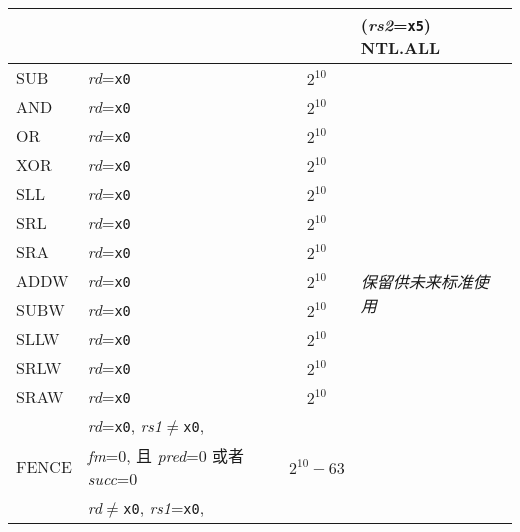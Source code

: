 \begin{table}[hbt]
\begin{tabular}{|l|l|c|l|}
                        &                                             &                             & ({\em rs2}={\tt x5}) NTL.ALL \\ \hline
  SUB                   & {\em rd}={\tt x0}                           & $2^{10}$                    & \multirow{22}{*}{\em 保留供未来标准使用} \\ \cline{1-3}
  AND                   & {\em rd}={\tt x0}                           & $2^{10}$                    & \\ \cline{1-3}
  OR                    & {\em rd}={\tt x0}                           & $2^{10}$                    & \\ \cline{1-3}
  XOR                   & {\em rd}={\tt x0}                           & $2^{10}$                    & \\ \cline{1-3}
  SLL                   & {\em rd}={\tt x0}                           & $2^{10}$                    & \\ \cline{1-3}
  SRL                   & {\em rd}={\tt x0}                           & $2^{10}$                    & \\ \cline{1-3}
  SRA                   & {\em rd}={\tt x0}                           & $2^{10}$                    & \\ \cline{1-3}
  ADDW                  & {\em rd}={\tt x0}                           & $2^{10}$                    & \\ \cline{1-3}
  SUBW                  & {\em rd}={\tt x0}                           & $2^{10}$                    & \\ \cline{1-3}
  SLLW                  & {\em rd}={\tt x0}                           & $2^{10}$                    & \\ \cline{1-3}
  SRLW                  & {\em rd}={\tt x0}                           & $2^{10}$                    & \\ \cline{1-3}
  SRAW                  & {\em rd}={\tt x0}                           & $2^{10}$                    & \\ \cline{1-3}
  \multirow{3}{*}{FENCE}& {\em rd}={\tt x0}, {\em rs1}$\neq${\tt x0}, & \multirow{3}{*}{$2^{10}-63$}& \\
                        & {\em fm}=0, 且 {\em pred}=0 或者 {\em succ}=0                      &                             & \\ \cline{1-3}
  \multirow{3}{*}{FENCE}& {\em rd}$\neq${\tt x0}, {\em rs1}={\tt x0}, & \multirow{3}{*}{$2^{10}-63$}& \\

\end{tabular}
\end{table}
